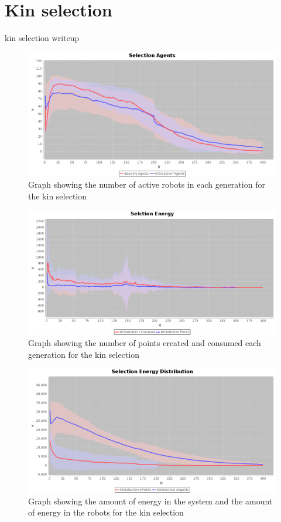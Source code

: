 \documentclass[a4paper]{book}
\begin{document}
\section{Kin selection}

kin selection writeup

\begin{figure}
	\includegraphics[width=\textwidth]{expr2/selection_agents.png}
    \caption{Graph showing the number of active robots in each generation for the kin selection}
    \label{fig:agents_selection}
\end{figure}

\begin{figure}
	\includegraphics[width=\textwidth]{expr2/selection_energy.png}
    \caption{Graph showing the number of points created and consumed each generation for the kin selection}
    \label{fig:points_selection}
\end{figure}

\begin{figure}
\includegraphics[width=\textwidth]{expr2/selection_distribution.png}
    \caption{Graph showing the amount of energy in the system and the amount of energy in the robots for the kin selection}
\label{fig:distribution_selection}
\end{figure}
\end{document}
